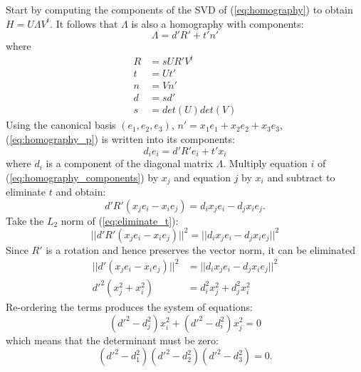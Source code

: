 \documentclass{article}
\begin{document}
Start by computing the components of the SVD of (\eqref {eq:homography}) to obtain $H = U \Lambda V^t$. It follows that $\Lambda$ is also a homography with components:
%
\begin {equation} \label {eq:homography_p}
\Lambda = d' R' + t' n'
\end {equation}
%
where
%
\begin {equation}
\begin {aligned}
R &= s U R' V^t \\
t &= U t' \\
n &= V n' \\
d &= s d' \\
s &= det (U) det (V)
\end {aligned}
\end {equation}
%
Using the canonical basis $(e_1, e_2, e_3)$, $n' = x_1 e_1 + x_2 e_2 + x_3 e_3$, (\eqref {eq:homography_p}) is written into its components:
%
\begin {equation} \label {eq:homography_components}
d_i e_i = d' R' e_i + t' x_i
\end {equation}
%
where $d_i$ is a component of the diagonal matrix $\Lambda$.
Multiply equation $i$ of (\eqref {eq:homography_components}) by $x_j$ and equation $j$ by $x_i$ and subtract to eliminate $t$ and obtain:
%
\begin {equation} \label {eq:eliminate_t}
d' R' (x_j e_i - x_i e_j) = d_i x_j e_i - d_j x_i e_j.
\end {equation}
%
Take the $L_2$ norm of (\eqref {eq:eliminate_t}):
%
\begin {equation}
||d' R' (x_j e_i - x_i e_j)||^2 = ||d_i x_j e_i - d_j x_i e_j||^2
\end {equation}
%
Since $R'$ is a rotation and hence preserves the vector norm, it can be eliminated
%
\begin {equation}
\begin {aligned}
||d' (x_j e_i - x_i e_j)||^2 &= ||d_i x_j e_i - d_j x_i e_j||^2 \\
d'^2 (x_j^2 + x_i^2) &= d_i^2 x_j^2 + d_j^2 x_i^2
\end {aligned}
\end {equation}
%
Re-ordering the terms produces the system of equations:
%
\begin {equation}
\label {eq:system_of_equations}
(d'^2 - d_j^2) x_i^2 + (d'^2 - d_i^2) x_j^2 = 0
\end {equation}
%
which means that the determinant must be zero:
%
\begin {equation}
(d'^2 - d_1^2) (d'^2 - d_2^2) (d'^2 - d_3^2) = 0.
\end {equation}
\end{document}
